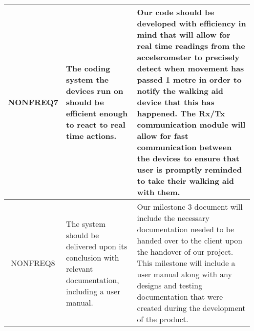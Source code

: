 \begin{xltabular}[H]{\textwidth}{c | X | X}
		\midrule

        NONFREQ7

        &

        The coding system the devices run on should be efficient enough to react to real time actions.

        &

        Our code should be developed with efficiency in mind that will allow for real time readings from the accelerometer to precisely detect when movement has passed 1 metre in order to notify the walking aid device that this has happened. The Rx/Tx communication module will allow for fast communication between the devices to ensure that user is promptly reminded to take their walking aid with them.\\

		\midrule

        NONFREQ8

        &

        The system should be delivered upon its conclusion with relevant documentation, including a user manual.

        &

        Our milestone 3 document will include the necessary documentation needed to be handed over to the client upon the handover of our project. This milestone will include a user manual along with any designs and testing documentation that were created during the development of the product.\\

	\end{xltabular}
	\label{tbl:non_func_reqs_table}
